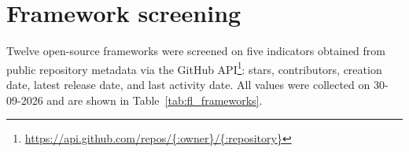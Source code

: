 
\section{Framework screening}
\label{appendix:maturity}

Twelve open-source frameworks were screened on five indicators obtained from public repository metadata via the GitHub API\footnote{\url{https://api.github.com/repos/\{:owner\}/\{:repository\}}}: stars, contributors, creation date, latest release date, and last activity date. All values were collected on 30-09-2026 and are shown in Table~\ref{tab:fl_frameworks}.



\providecommand{\fw}[2]{%
  \begin{tabular}[t]{@{}l@{}}
    #1\\[-1pt]
    \textit{#2}
  \end{tabular}%
}

